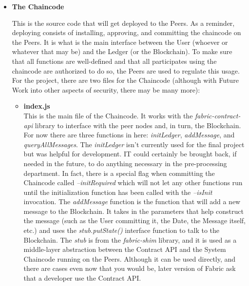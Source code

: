 		\begin{itemize}

			\item \textbf{The Chaincode}

				\hspace{10mm}This is the source code that will get deployed to the Peers. As a reminder, deploying consists of installing, approving, and committing the chaincode on the Peers. It is what is the main interface between the User (whoever or whatever that may be) and the Ledger (or the Blockchain). To make sure that all functions are well-defined and that all participates using the chaincode are authorized to do so, the Peers are used to regulate this usage. For the project, there are two files for the Chaincode (although with Future Work into other aspects of security, there may be many more):
				
					\begin{itemize}

						\item \textbf{index.js}\\

							\hspace{10mm}This is the main file of the Chaincode. It works with the \textit{fabric-contract-api} library to interface with the peer nodes and, in turn, the Blockchain. For now there are three functions in here: \textit{initLedger}, \textit{addMessage}, and \textit{queryAllMessages}. The \textit{initLedger} isn't currently used for the final project but was helpful for development. IT could certainly be brought back, if needed in the future, to do anything necessary in the pre-processing department. In fact, there is a special flag when committing the Chaincode called \textit{--initRequired} which will not let any other functions run until the initialization function has been called with the \textit{--isInit} invocation. The \textit{addMessage} function is the function that will add a new message to the Blockchain. It takes in the parameters that help construct the message (such as the User committing it, the Date, the Message itself, etc.) and uses the \textit{stub.putState()} interface function to talk to the Blockchain. The \textit{stub} is from the \textit{fabric-shim} library, and it is used as a middle-layer abstraction between the Contract API and the System Chaincode running on the Peers. Although it can be used directly, and there are cases even now that you would be, later version of Fabric ask that a developer use the Contract API.\\
						

\end{itemize}
\end{itemize}
